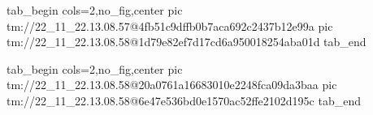  
 
 
 
 

\qqSecOrig


\ifcmt
  tab_begin cols=2,no_fig,center
    pic tm://22_11_22.13.08.57@4fb51c9dffb0b7aca692c2437b12e99a
    pic tm://22_11_22.13.08.58@1d79e82ef7d17cd6a950018254aba01d
  tab_end
\fi


\ifcmt
  tab_begin cols=2,no_fig,center
    pic tm://22_11_22.13.08.58@20a0761a16683010e2248fca09da3baa
    pic tm://22_11_22.13.08.58@6e47e536bd0e1570ac52ffe2102d195c
  tab_end
\fi

